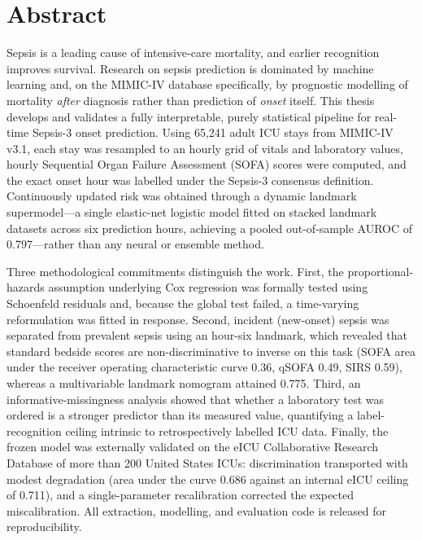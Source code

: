 \chapter*{Abstract}

Sepsis is a leading cause of intensive-care mortality, and earlier recognition
improves survival. Research on sepsis prediction is dominated by machine
learning and, on the MIMIC-IV database specifically, by prognostic modelling of
mortality \emph{after} diagnosis rather than prediction of \emph{onset} itself.
This thesis develops and validates a fully interpretable, purely statistical
pipeline for real-time Sepsis-3 onset prediction. Using 65{,}241 adult ICU
stays from MIMIC-IV v3.1, each stay was resampled to an hourly grid of vitals
and laboratory values, hourly Sequential Organ Failure Assessment (SOFA) scores
were computed, and the exact onset hour was labelled under the Sepsis-3
consensus definition. Continuously updated risk was obtained through a dynamic
landmark supermodel---a single elastic-net logistic model fitted on stacked
landmark datasets across six prediction hours, achieving a pooled
out-of-sample AUROC of 0.797---rather than any neural or ensemble method.

Three methodological commitments distinguish the work. First, the
proportional-hazards assumption underlying Cox regression was formally tested
using Schoenfeld residuals and, because the global test failed, a time-varying
reformulation was fitted in response. Second, incident (new-onset) sepsis was
separated from prevalent sepsis using an hour-six landmark, which revealed that
standard bedside scores are non-discriminative to inverse on this task (SOFA
area under the receiver operating characteristic curve 0.36, qSOFA 0.49, SIRS
0.59), whereas a multivariable landmark nomogram attained 0.775. Third, an
informative-missingness analysis showed that whether a laboratory test was
ordered is a stronger predictor than its measured value, quantifying a
label-recognition ceiling intrinsic to retrospectively labelled ICU data.
Finally, the frozen model was externally validated on the eICU Collaborative
Research Database of more than 200 United States ICUs: discrimination
transported with modest degradation (area under the curve 0.686 against an
internal eICU ceiling of 0.711), and a single-parameter recalibration corrected
the expected miscalibration. All extraction, modelling, and evaluation code is
released for reproducibility.
